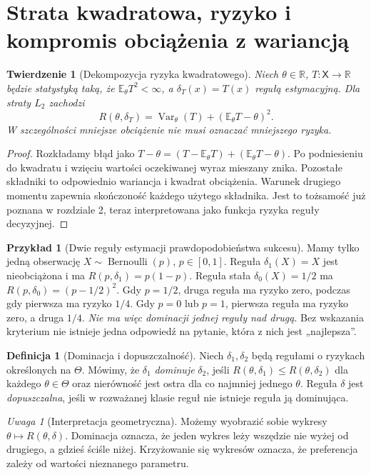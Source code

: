 \documentclass[11pt,a4paper,oneside]{report}
\numberwithin{equation}{chapter}
\theoremstyle{plain}
\newtheorem{twierdzenie}{Twierdzenie}[chapter]
\theoremstyle{definition}
\newtheorem{definicja}{Definicja}[chapter]
\newtheorem{przyklad}{Przykład}[chapter]
\theoremstyle{remark}
\newtheorem{uwaga}{Uwaga}[chapter]
\newcommand{\R}{\mathbb R}
\newcommand{\E}{\mathbb E}
\newcommand{\Var}{\operatorname{Var}}
\begin{document}
\section{Strata kwadratowa, ryzyko i kompromis obciążenia z wariancją}
\begin{twierdzenie}[Dekompozycja ryzyka kwadratowego]\label{thm:decision-mse}
Niech $\theta\in\R$, $T:\mathsf X\to\R$ będzie statystyką taką, że
$\E_\theta T^2<\infty$, a $\delta_T(x)=T(x)$ regułą estymacyjną.
Dla straty $L_2$ zachodzi
\[
R(\theta,\delta_T)
=\Var_\theta(T)+(\E_\theta T-\theta)^2.
\]
W szczególności mniejsze obciążenie nie musi oznaczać mniejszego ryzyka.
\end{twierdzenie}
\begin{proof}
Rozkładamy błąd jako
$T-\theta=(T-\E_\theta T)+(\E_\theta T-\theta)$.
Po podniesieniu do kwadratu i wzięciu wartości oczekiwanej
wyraz mieszany znika. Pozostałe składniki to odpowiednio wariancja
i kwadrat obciążenia. Warunek drugiego momentu zapewnia skończoność
każdego użytego składnika. Jest to tożsamość już poznana w rozdziale 2,
teraz interpretowana jako funkcja ryzyka reguły decyzyjnej.
\end{proof}

\begin{przyklad}[Dwie reguły estymacji prawdopodobieństwa sukcesu]
Mamy tylko jedną obserwację $X\sim\operatorname{Bernoulli}(p)$,
$p\in[0,1]$. Reguła $\delta_1(X)=X$ jest nieobciążona i ma
$R(p,\delta_1)=p(1-p)$. Reguła stała $\delta_0(X)=1/2$ ma
$R(p,\delta_0)=(p-1/2)^2$.
Gdy $p=1/2$, druga reguła ma ryzyko zero, podczas gdy pierwsza ma
ryzyko $1/4$. Gdy $p=0$ lub $p=1$, pierwsza reguła ma ryzyko zero,
a druga $1/4$. \emph{Nie ma więc dominacji jednej reguły nad drugą}.
Bez wskazania kryterium nie istnieje jedna odpowiedź na pytanie,
która z nich jest „najlepsza”.
\end{przyklad}

\begin{definicja}[Dominacja i dopuszczalność]\label{def:admissible}
Niech $\delta_1,\delta_2$ będą regułami o ryzykach określonych
na $\Theta$. Mówimy, że $\delta_1$ \emph{dominuje} $\delta_2$,
jeśli $R(\theta,\delta_1)\le R(\theta,\delta_2)$ dla każdego
$\theta\in\Theta$ oraz nierówność jest ostra dla co najmniej jednego
$\theta$. Reguła $\delta$ jest \emph{dopuszczalna}, jeśli w rozważanej
klasie reguł nie istnieje reguła ją dominująca.
\end{definicja}

\begin{uwaga}[Interpretacja geometryczna]
Możemy wyobrazić sobie wykresy $\theta\mapsto R(\theta,\delta)$.
Dominacja oznacza, że jeden wykres leży wszędzie nie wyżej od
drugiego, a gdzieś ściśle niżej. Krzyżowanie się wykresów oznacza,
że preferencja zależy od wartości nieznanego parametru.
\end{uwaga}
\end{document}
